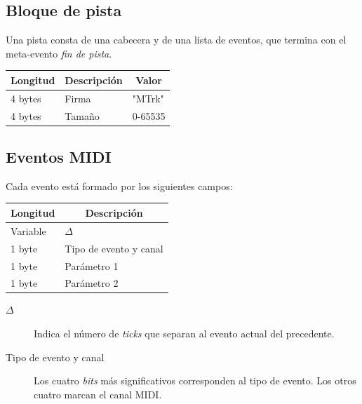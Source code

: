 \subsection{Bloque de pista}

Una pista consta de una cabecera y de una lista de eventos, que termina con el meta-evento \textit{fin de pista}.

\smallskip

\begin{center}
	\begin{tabular}{|l|l|l|}
		\hline \multicolumn{1}{|c|}{\textbf{Longitud}} & \multicolumn{1}{c|}{\textbf{Descripción}} & \multicolumn{1}{c|}{\textbf{Valor}} \\
		\hline 4 bytes & Firma & "MTrk" \\ 
		\hline 4 bytes & Tamaño & 0-65535 \\  
		\hline 
	\end{tabular}
	\smallskip
\end{center}

\smallskip

\subsection{Eventos MIDI}

Cada evento está formado por los siguientes campos:

\smallskip

\begin{center}
	\begin{tabular}{|l|l|}
		\hline \multicolumn{1}{|c|}{\textbf{Longitud}} & \multicolumn{1}{c|}{\textbf{Descripción}} \\
		\hline Variable & $\Delta$ \\ 
		\hline 1 byte & Tipo de evento y canal \\ 
		\hline 1 byte & Parámetro 1 \\ 
		\hline 1 byte & Parámetro 2 \\ 
		\hline 
	\end{tabular}
	\smallskip
\end{center}

\smallskip

\begin{description}
	\item[$\Delta$] Indica el número de \textit{ticks} que separan al evento actual del precedente.
	\item[Tipo de evento y canal] Los cuatro \textit{bits} más significativos corresponden al tipo de evento. Los otros cuatro marcan el canal \acrshort{MIDI}.
\end{description}

